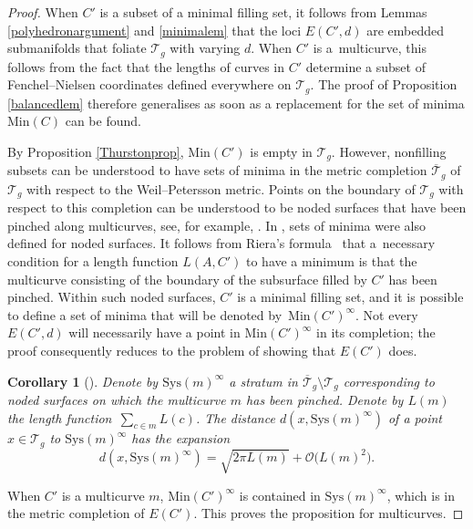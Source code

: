 \documentclass[11pt]{article}
\numberwithin{equation}{section}
\numberwithin{equation}{section}
\newtheorem{Corollary}[Theorem]{Corollary}
\begin{document}
\begin{proof}
When $C'$ is a subset of a minimal filling set, it follows from Lemmas \ref{polyhedronargument} and \ref{minimalem} that the loci $E(C',d)$ are embedded submanifolds that foliate $\mathcal{T}_{g}$ with varying $d$. When $C'$ is a~multicurve, this follows from the fact that the lengths of curves in $C'$ determine a subset of Fenchel--Nielsen coordinates defined everywhere on $\mathcal{T}_{g}$. The proof of Proposition \ref{balancedlem} therefore generalises as soon as a replacement for the set of minima $\mathrm{Min}(C)$ can be found.

By Proposition \ref{Thurstonprop}, $\mathrm{Min}(C')$ is empty in $\mathcal{T}_{g}$. However, nonfilling subsets can be understood to have sets of minima in the metric completion $\overline{\mathcal{T}}_{g}$ of $\mathcal{T}_{g}$ with respect to the Weil--Petersson metric. Points on the boundary of $\mathcal{T}_{g}$ with respect to this completion can be understood to be noded surfaces that have been pinched along multicurves, see, for example, \cite{wolpert2005}. In \cite{SchmutzMorse}, sets of minima were also defined for noded surfaces. It follows from Riera's formula~\cite{Riera} that a~necessary condition for a length function $L(A, C')$ to have a minimum is that the multicurve consisting of the boundary of the subsurface filled by $C'$ has been pinched. Within such noded surfaces, $C'$ is a minimal filling set, and it is possible to define a set of minima that will be denoted by~$\mathrm{Min}(C')^{\infty}$. Not every $E(C',d)$ will necessarily have a point in $\mathrm{Min}(C')^{\infty}$ in its completion; the proof consequently reduces to the problem of showing that $E(C')$ does.

\begin{Corollary}[{\cite[Corollary 21]{wolpert2005}}]
\label{wolcor}
Denote by $\mathrm{Sys}(m)^{\infty}$ a stratum in $\overline{\mathcal{T}}_{g}\setminus \mathcal{T}_{g}$ corresponding to noded surfaces on which the multicurve $m$ has been pinched. Denote by $L(m)$ the length function~$\sum_{c\in m}L(c)$.
The distance $d(x, \mathrm{Sys}(m)^{\infty})$ of a point $x\in \mathcal{T}_{g}$ to $\mathrm{Sys}(m)^{\infty}$ has the expansion
\begin{equation*}
d(x, \mathrm{Sys}(m)^{\infty})=\sqrt{2\pi L(m)}+\mathcal{O}\bigl(L(m)^{2}\bigr).
\end{equation*}
\end{Corollary}


When $C'$ is a multicurve $m$, $\mathrm{Min}(C')^{\infty}$ is contained in $\mathrm{Sys}(m)^{\infty}$, which is in the metric completion of $E(C')$. This proves the proposition for multicurves.


\end{proof}
\end{document}
